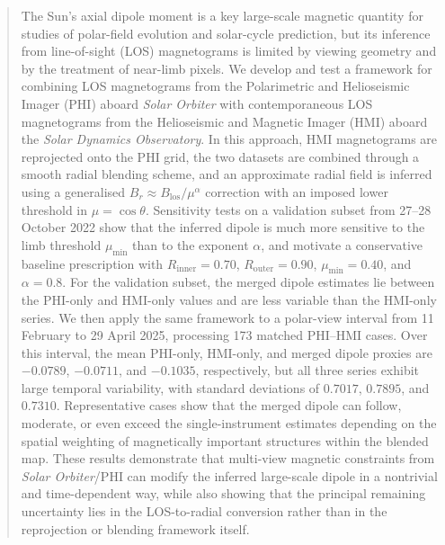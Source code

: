\documentclass[namedreferences,hyperref,optionalrh]{spr-sola}
\begin{document}
\begin{frontmatter}
\begin{abstract}
The Sun’s axial dipole moment is a key large-scale magnetic quantity for studies of polar-field evolution and solar-cycle prediction, but its inference from line-of-sight (LOS) magnetograms is limited by viewing geometry and by the treatment of near-limb pixels. We develop and test a framework for combining LOS magnetograms from the Polarimetric and Helioseismic Imager (PHI) aboard \textit{Solar Orbiter} with contemporaneous LOS magnetograms from the Helioseismic and Magnetic Imager (HMI) aboard the \textit{Solar Dynamics Observatory}. In this approach, HMI magnetograms are reprojected onto the PHI grid, the two datasets are combined through a smooth radial blending scheme, and an approximate radial field is inferred using a generalised $B_{r}\approx B_{\mathrm{los}}/\mu^{\alpha}$ correction with an imposed lower threshold in $\mu=\cos\theta$. Sensitivity tests on a validation subset from 27--28 October 2022 show that the inferred dipole is much more sensitive to the limb threshold $\mu_{\min}$ than to the exponent $\alpha$, and motivate a conservative baseline prescription with $R_{\mathrm{inner}}=0.70$, $R_{\mathrm{outer}}=0.90$, $\mu_{\min}=0.40$, and $\alpha=0.8$. For the validation subset, the merged dipole estimates lie between the PHI-only and HMI-only values and are less variable than the HMI-only series. We then apply the same framework to a polar-view interval from 11 February to 29 April 2025, processing 173 matched PHI--HMI cases. Over this interval, the mean PHI-only, HMI-only, and merged dipole proxies are $-0.0789$, $-0.0711$, and $-0.1035$, respectively, but all three series exhibit large temporal variability, with standard deviations of $0.7017$, $0.7895$, and $0.7310$. Representative cases show that the merged dipole can follow, moderate, or even exceed the single-instrument estimates depending on the spatial weighting of magnetically important structures within the blended map. These results demonstrate that multi-view magnetic constraints from \textit{Solar Orbiter}/PHI can modify the inferred large-scale dipole in a nontrivial and time-dependent way, while also showing that the principal remaining uncertainty lies in the LOS-to-radial conversion rather than in the reprojection or blending framework itself.
\end{abstract}
\end{frontmatter}
\end{document}

